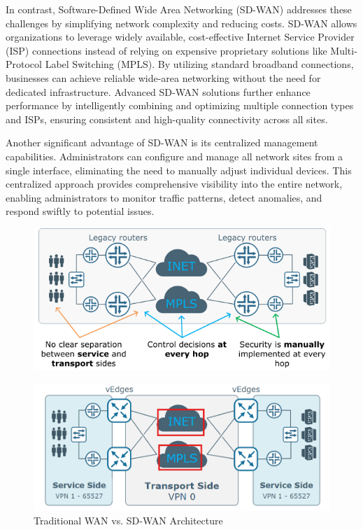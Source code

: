\documentclass[12pt,english]{report}
\begin{document}
In contrast, Software-Defined Wide Area Networking (SD-WAN) addresses these challenges by simplifying network complexity and reducing costs. SD-WAN allows organizations to leverage widely available, cost-effective Internet Service Provider (ISP) connections instead of relying on expensive proprietary solutions like Multi-Protocol Label Switching (MPLS). By utilizing standard broadband connections, businesses can achieve reliable wide-area networking without the need for dedicated infrastructure. Advanced SD-WAN solutions further enhance performance by intelligently combining and optimizing multiple connection types and ISPs, ensuring consistent and high-quality connectivity across all sites.

Another significant advantage of SD-WAN is its centralized management capabilities. Administrators can configure and manage all network sites from a single interface, eliminating the need to manually adjust individual devices. This centralized approach provides comprehensive visibility into the entire network, enabling administrators to monitor traffic patterns, detect anomalies, and respond swiftly to potential issues\cite{ref4}.
\begin{figure}[H]
    \centering
    \includegraphics[width= 0.7 \textwidth]{chapter1/legacy-wan.png}
\end{figure}
\begin{figure}[H]
    \centering
    \includegraphics[width= 0.7 \textwidth]{chapter1/sdwan-paths.png}
    \caption{Traditional WAN vs. SD-WAN Architecture \cite{ref4}}
    \label{fig: Traditional WAN vs. SD-WAN Architecture}
\end{figure}
\end{document}
